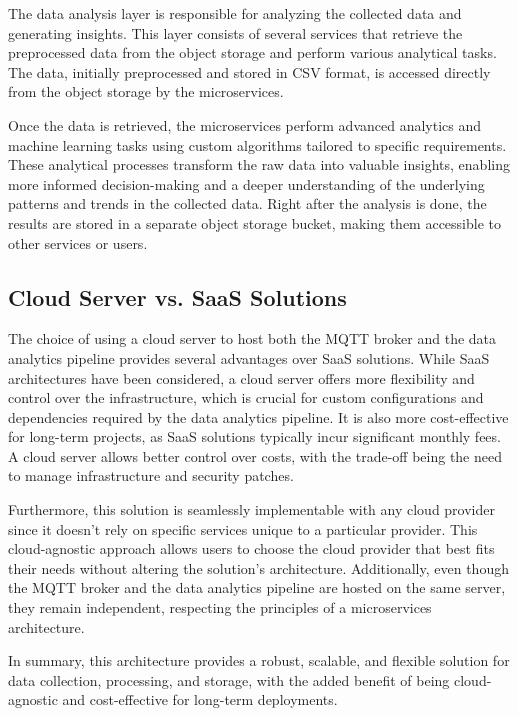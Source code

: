 The data analysis layer is responsible for analyzing the collected data and generating insights. This layer consists of several services that retrieve the preprocessed data from the object storage and perform various analytical tasks. The data, initially preprocessed and stored in CSV format, is accessed directly from the object storage by the microservices.

Once the data is retrieved, the microservices perform advanced analytics and machine learning tasks using custom algorithms tailored to specific requirements. These analytical processes transform the raw data into valuable insights, enabling more informed decision-making and a deeper understanding of the underlying patterns and trends in the collected data.
Right after the analysis is done, the results are stored in a separate object storage bucket, making them accessible to other services or users.

\subsection{Cloud Server vs. SaaS Solutions}

The choice of using a cloud server to host both the MQTT broker and the data analytics pipeline provides several advantages over SaaS solutions. While SaaS architectures have been considered, a cloud server offers more flexibility and control over the infrastructure, which is crucial for custom configurations and dependencies required by the data analytics pipeline. It is also more cost-effective for long-term projects, as SaaS solutions typically incur significant monthly fees. A cloud server allows better control over costs, with the trade-off being the need to manage infrastructure and security patches.

Furthermore, this solution is seamlessly implementable with any cloud provider since it doesn't rely on specific services unique to a particular provider. This cloud-agnostic approach allows users to choose the cloud provider that best fits their needs without altering the solution's architecture. Additionally, even though the MQTT broker and the data analytics pipeline are hosted on the same server, they remain independent, respecting the principles of a microservices architecture.

In summary, this architecture provides a robust, scalable, and flexible solution for data collection, processing, and storage, with the added benefit of being cloud-agnostic and cost-effective for long-term deployments.

